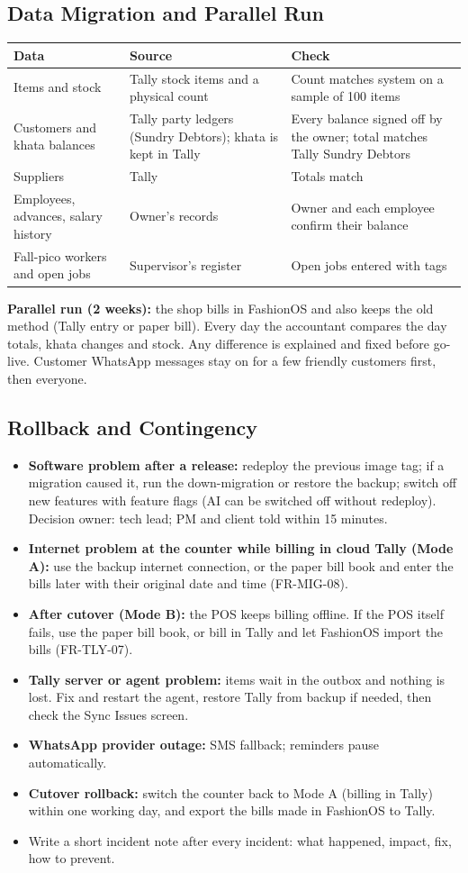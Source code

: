 \documentclass[11pt,a4paper]{article}
\newcommand{\hdr}{\rowcolor{hdrgray}\bfseries}
\begin{document}
\subsection{Data Migration and Parallel Run}
\begin{longtable}{L{3.6cm}L{4.4cm}L{8.5cm}}
\hdr Data & Source & Check \\ \endhead
Items and stock & Tally stock items and a physical count & Count matches system on a sample of 100 items \\
Customers and khata balances & Tally party ledgers (Sundry Debtors); khata is kept in Tally & Every balance signed off by the owner; total matches Tally Sundry Debtors \\
Suppliers & Tally & Totals match \\
Employees, advances, salary history & Owner's records & Owner and each employee confirm their balance \\
Fall-pico workers and open jobs & Supervisor's register & Open jobs entered with tags \\
\end{longtable}
\textbf{Parallel run (2 weeks):} the shop bills in FashionOS and also keeps the old method (Tally entry or paper bill). Every day the accountant compares the day totals, khata changes and stock. Any difference is explained and fixed before go-live. Customer WhatsApp messages stay on for a few friendly customers first, then everyone.

\subsection{Rollback and Contingency}
\begin{itemize}
\item \textbf{Software problem after a release:} redeploy the previous image tag; if a migration caused it, run the down-migration or restore the backup; switch off new features with feature flags (AI can be switched off without redeploy). Decision owner: tech lead; PM and client told within 15 minutes.
\item \textbf{Internet problem at the counter while billing in cloud Tally (Mode A):} use the backup internet connection, or the paper bill book and enter the bills later with their original date and time (FR-MIG-08).
\item \textbf{After cutover (Mode B):} the POS keeps billing offline. If the POS itself fails, use the paper bill book, or bill in Tally and let FashionOS import the bills (FR-TLY-07).
\item \textbf{Tally server or agent problem:} items wait in the outbox and nothing is lost. Fix and restart the agent, restore Tally from backup if needed, then check the Sync Issues screen.
\item \textbf{WhatsApp provider outage:} SMS fallback; reminders pause automatically.
\item \textbf{Cutover rollback:} switch the counter back to Mode A (billing in Tally) within one working day, and export the bills made in FashionOS to Tally.
\item Write a short incident note after every incident: what happened, impact, fix, how to prevent.
\end{itemize}
\end{document}

